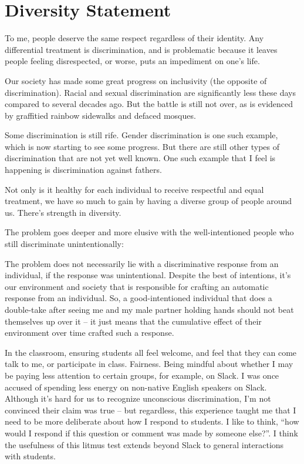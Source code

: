 \documentclass[]{book}
\begin{document}
\hypertarget{diversity-statement}{%
\chapter{Diversity Statement}\label{diversity-statement}}

To me, people deserve the same respect regardless of their identity. Any differential treatment is discrimination, and is problematic because it leaves people feeling disrespected, or worse, puts an impediment on one's life.

Our society has made some great progress on inclusivity (the opposite of discrimination). Racial and sexual discrimination are significantly less these days compared to several decades ago. But the battle is still not over, as is evidenced by graffitied rainbow sidewalks and defaced mosques.

Some discrimination is still rife. Gender discrimination is one such example, which is now starting to see some progress. But there are still other types of discrimination that are not yet well known. One such example that I feel is happening is discrimination against fathers.

Not only is it healthy for each individual to receive respectful and equal treatment, we have so much to gain by having a diverse group of people around us. There's strength in diversity.

The problem goes deeper and more elusive with the well-intentioned people who still discriminate unintentionally:

The problem does not necessarily lie with a discriminative response from an individual, if the response was unintentional. Despite the best of intentions, it's our environment and society that is responsible for crafting an automatic response from an individual. So, a good-intentioned individual that does a double-take after seeing me and my male partner holding hands should not beat themselves up over it -- it just means that the cumulative effect of their environment over time crafted such a response.

In the classroom, ensuring students all feel welcome, and feel that they can come talk to me, or participate in class. Fairness. Being mindful about whether I may be paying less attention to certain groups, for example, on Slack. I was once accused of spending less energy on non-native English speakers on Slack. Although it's hard for us to recognize unconscious discrimination, I'm not convinced their claim was true -- but regardless, this experience taught me that I need to be more deliberate about how I respond to students. I like to think, ``how would I respond if this question or comment was made by someone else?''. I think the usefulness of this litmus test extends beyond Slack to general interactions with students.
\end{document}
